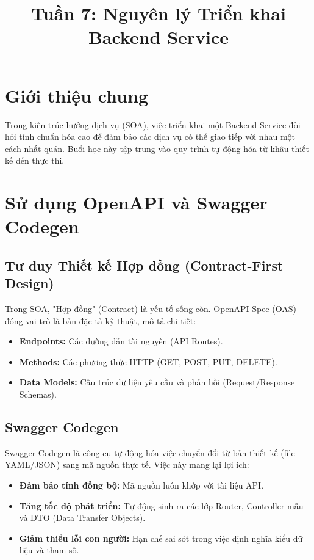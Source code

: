 \documentclass[12pt,a4paper]{article}
\title{\textbf{Tuần 7: Nguyên lý Triển khai Backend Service}}
\date{}
\begin{document}
\maketitle

\tableofcontents
\newpage

\section{Giới thiệu chung}
Trong kiến trúc hướng dịch vụ (SOA), việc triển khai một Backend Service đòi hỏi tính chuẩn hóa cao để đảm bảo các dịch vụ có thể giao tiếp với nhau một cách nhất quán. Buổi học này tập trung vào quy trình tự động hóa từ khâu thiết kế đến thực thi.

\section{Sử dụng OpenAPI và Swagger Codegen}

\subsection{Tư duy Thiết kế Hợp đồng (Contract-First Design)}
Trong SOA, "Hợp đồng" (Contract) là yếu tố sống còn. OpenAPI Spec (OAS) đóng vai trò là bản đặc tả kỹ thuật, mô tả chi tiết:
\begin{itemize}
    \item \textbf{Endpoints:} Các đường dẫn tài nguyên (API Routes).
    \item \textbf{Methods:} Các phương thức HTTP (GET, POST, PUT, DELETE).
    \item \textbf{Data Models:} Cấu trúc dữ liệu yêu cầu và phản hồi (Request/Response Schemas).
\end{itemize}

\subsection{Swagger Codegen}
Swagger Codegen là công cụ tự động hóa việc chuyển đổi từ bản thiết kế (file YAML/JSON) sang mã nguồn thực tế. Việc này mang lại lợi ích:
\begin{itemize}
    \item \textbf{Đảm bảo tính đồng bộ:} Mã nguồn luôn khớp với tài liệu API.
    \item \textbf{Tăng tốc độ phát triển:} Tự động sinh ra các lớp Router, Controller mẫu và DTO (Data Transfer Objects).
    \item \textbf{Giảm thiểu lỗi con người:} Hạn chế sai sót trong việc định nghĩa kiểu dữ liệu và tham số.
\end{itemize}
\end{document}
